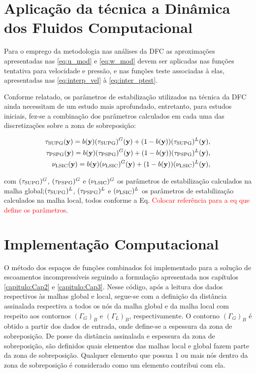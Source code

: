 \section{Aplicação da técnica a Dinâmica dos Fluidos Computacional}

Para o emprego da metodologia nas análises da DFC as aproximações apresentadas nas \autoref{eq:u_mod} e \autoref{eq:w_mod} devem ser aplicadas nas funções tentativa para velocidade e pressão, e nas funções teste associadas à elas, apresentadas nas \autoref{eq:interp_vel} à \autoref{eq:inter_ptest}.

Conforme relatado, os parâmetros de estabilização utilizados na técnica da DFC ainda necessitam de um estudo mais aprofundado, entretanto, para estudos iniciais, fez-se a combinação dos parâmetros calculados em cada uma das discretizações sobre a zona de sobreposição:

\begin{align}
\tau_{\mathrm{SUPG}}(\mathbf{y}) =  b(\mathbf{y})(\tau_{\mathrm{SUPG}})^{G}(\mathbf{y}) + (1-b(\mathbf{y}))(\tau_{\mathrm{SUPG}})^{L}(\mathbf{y}),\\
\tau_{\mathrm{PSPG}}(\mathbf{y}) =  b(\mathbf{y})(\tau_{\mathrm{PSPG}})^{G}(\mathbf{y}) + (1-b(\mathbf{y}))(\tau_{\mathrm{PSPG}})^{L}(\mathbf{y}),\\
\nu_{\mathrm{LSIC}}(\mathbf{y}) =  b(\mathbf{y})(\nu_{\mathrm{LSIC}})^{G}(\mathbf{y}) + (1-b(\mathbf{y}))(\nu_{\mathrm{LSIC}})^{L}(\mathbf{y}),
\end{align}

\noindent com $(\tau_{\mathrm{SUPG}})^{G}$, $(\tau_{\mathrm{PSPG}})^{G}$ e $(\nu_{\mathrm{LSIC}})^{G}$ os parâmetros de estabilização calculados na malha global;$(\tau_{\mathrm{SUPG}})^{L}$, $(\tau_{\mathrm{PSPG}})^{L}$ e  $(\nu_{\mathrm{LSIC}})^{L}$ os parâmetros de estabilização calculados na malha local, todos conforme a Eq. \textcolor{red}{Colocar referência para a eq que define os parâmetros}.

\section{Implementação Computacional}

O método dos espaços de funções combinados foi implementado para a solução de escoamentos incompressíveis seguindo a formulação apresentada nos capítulos \ref{capitulo:Cap2} e \ref{capitulo:Cap3}. Nesse código, após a leitura dos dados respectivos às malhas global e local, segue-se com a definição da distância assinalada respectiva a todos os nós da malha global e da malha local com respeito aos contornos $(\Gamma_{G})_{B}$ e $(\Gamma_{L})_{B}$, respectivamente. O contorno  $(\Gamma_{G})_{B}$ é obtido a partir dos dados de entrada, onde define-se a espessura da zona de sobreposição. De posse da distância assinalada e espessura da zona de sobreposição, são definidos quais elementos das malhas local e global fazem parte da zona de sobreposição. Qualquer elemento que possua 1 ou mais nós dentro da zona de sobreposição é considerado como um elemento contribui com ela.

